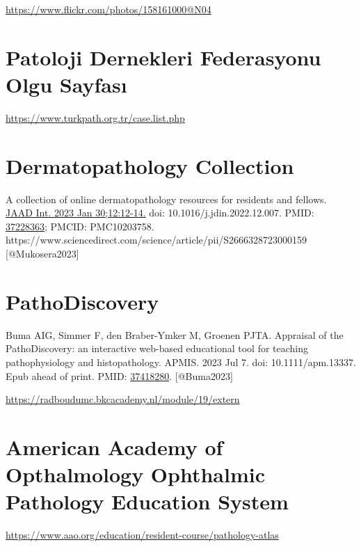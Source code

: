 \documentclass[
  letterpaper,
  DIV=11,
  numbers=noendperiod]{scrreprt}
\begin{document}
\url{https://www.flickr.com/photos/158161000@N04}

\hypertarget{patoloji-dernekleri-federasyonu-olgu-sayfasux131}{%
\section{Patoloji Dernekleri Federasyonu Olgu
Sayfası}\label{patoloji-dernekleri-federasyonu-olgu-sayfasux131}}

\url{https://www.turkpath.org.tr/case.list.php}

\hypertarget{dermatopathology-collection}{%
\section{Dermatopathology
Collection}\label{dermatopathology-collection}}

A collection of online dermatopathology resources for residents and
fellows.
\href{https://www.jaadinternational.org/article/S2666-3287(23)00015-9/fulltext}{JAAD
Int. 2023 Jan 30;12:12-14.} doi: 10.1016/j.jdin.2022.12.007. PMID:
\href{https://pubmed.ncbi.nlm.nih.gov/37228363/}{37228363}; PMCID:
PMC10203758.
https://www.sciencedirect.com/science/article/pii/S2666328723000159
{[}@Mukosera2023{]}

\hypertarget{pathodiscovery}{%
\section{PathoDiscovery}\label{pathodiscovery}}

Buma AIG, Simmer F, den Braber-Ymker M, Groenen PJTA. Appraisal of the
PathoDiscovery: an interactive web-based educational tool for teaching
pathophysiology and histopathology. APMIS. 2023 Jul 7. doi:
10.1111/apm.13337. Epub ahead of print. PMID:
\href{https://pubmed.ncbi.nlm.nih.gov/37418280/}{37418280}.
{[}@Buma2023{]}

\url{https://radboudumc.bkcacademy.nl/module/19/extern}

\hypertarget{american-academy-of-opthalmology-ophthalmic-pathology-education-system}{%
\section{American Academy of Opthalmology Ophthalmic Pathology Education
System}\label{american-academy-of-opthalmology-ophthalmic-pathology-education-system}}

\url{https://www.aao.org/education/resident-course/pathology-atlas}
\end{document}
